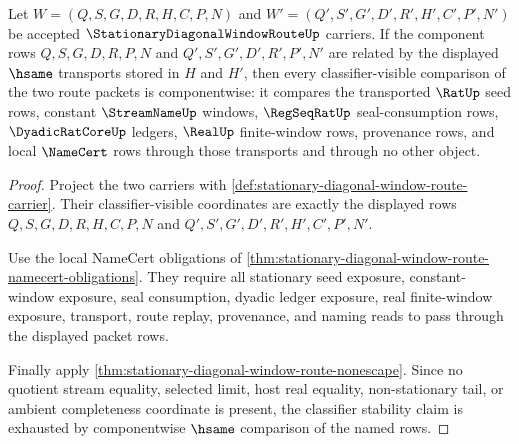 \begin{theorem}
\label{thm:stationary-diagonal-window-route-classifier-stability}
Let $W=(Q,S,G,D,R,H,C,P,N)$ and $W'=(Q',S',G',D',R',H',C',P',N')$ be accepted $\StationaryDiagonalWindowRouteUp$ carriers. If the component rows $Q,S,G,D,R,P,N$ and $Q',S',G',D',R',P',N'$ are related by the displayed $\hsame$ transports stored in $H$ and $H'$, then every classifier-visible comparison of the two route packets is componentwise: it compares the transported $\RatUp$ seed rows, constant $\StreamNameUp$ windows, $\RegSeqRatUp$ seal-consumption rows, $\DyadicRatCoreUp$ ledgers, $\RealUp$ finite-window rows, provenance rows, and local $\NameCert$ rows through those transports and through no other object.
\end{theorem}
\begin{proof}
Project the two carriers with \autoref{def:stationary-diagonal-window-route-carrier}. Their classifier-visible coordinates are exactly the displayed rows $Q,S,G,D,R,H,C,P,N$ and $Q',S',G',D',R',H',C',P',N'$.

Use the local NameCert obligations of \autoref{thm:stationary-diagonal-window-route-namecert-obligations}. They require all stationary seed exposure, constant-window exposure, seal consumption, dyadic ledger exposure, real finite-window exposure, transport, route replay, provenance, and naming reads to pass through the displayed packet rows.

Finally apply \autoref{thm:stationary-diagonal-window-route-nonescape}. Since no quotient stream equality, selected limit, host real equality, non-stationary tail, or ambient completeness coordinate is present, the classifier stability claim is exhausted by componentwise $\hsame$ comparison of the named rows.
\end{proof}

